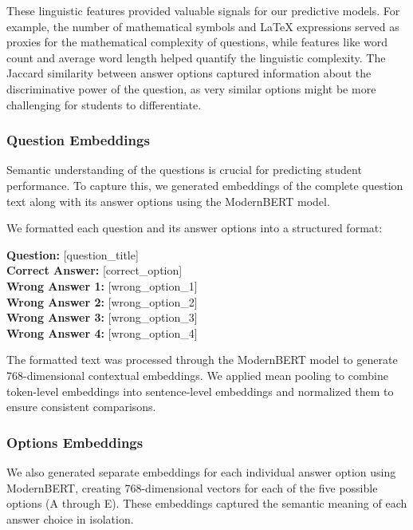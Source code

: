 \documentclass[
    a4paper, %
    10pt, %
    twoside, %
]{LTJournalArticle}
\begin{document}
These linguistic features provided valuable signals for our predictive models. For example, the number of mathematical symbols and LaTeX expressions served as proxies for the mathematical complexity of questions, while features like word count and average word length helped quantify the linguistic complexity. The Jaccard similarity between answer options captured information about the discriminative power of the question, as very similar options might be more challenging for students to differentiate.

\subsubsection{Question Embeddings}

Semantic understanding of the questions is crucial for predicting student performance. To capture this, we generated embeddings of the complete question text along with its answer options using the ModernBERT model.

We formatted each question and its answer options into a structured format:
    \begin{promptbox}
        \textbf{Question: } [question\_title]\\
        \textbf{Correct Answer: } [correct\_option]\\
        \textbf{Wrong Answer 1: } [wrong\_option\_1]\\
        \textbf{Wrong Answer 2: } [wrong\_option\_2]\\
        \textbf{Wrong Answer 3: } [wrong\_option\_3]\\
        \textbf{Wrong Answer 4: } [wrong\_option\_4]
    \end{promptbox}
    
The formatted text was processed through the ModernBERT model to generate 768-dimensional contextual embeddings. We applied mean pooling to combine token-level embeddings into sentence-level embeddings and normalized them to ensure consistent comparisons.


\subsubsection{Options Embeddings}

We also generated separate embeddings for each individual answer option using ModernBERT, creating 768-dimensional vectors for each of the five possible options (A through E). These embeddings captured the semantic meaning of each answer choice in isolation.
\end{document}
